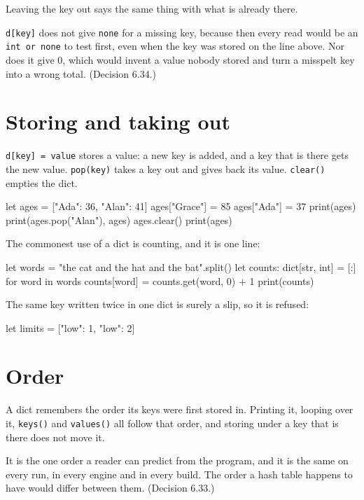 Leaving the key out says the same thing with what is already there.

\begin{why}
\verb|d[key]| does not give \verb|none| for a missing key, because then
every read would be an \verb|int or none| to test first, even when the
key was stored on the line above. Nor does it give 0, which would
invent a value nobody stored and turn a misspelt key into a wrong
total. (Decision 6.34.)
\end{why}

\section{Storing and taking out}

\verb|d[key] = value| stores a value: a new key is added, and a key
that is there gets the new value. \verb|pop(key)| takes a key out and
gives back its value. \verb|clear()| empties the dict.

\begin{zeno}
let ages = ["Ada": 36, "Alan": 41]
ages["Grace"] = 85
ages["Ada"] = 37
print(ages)
print(ages.pop("Alan"), ages)
ages.clear()
print(ages)
\end{zeno}

The commonest use of a dict is counting, and it is one line:

\begin{zeno}
let words = "the cat and the hat and the bat".split()
let counts: dict[str, int] = [:]
for word in words {
    counts[word] = counts.get(word, 0) + 1
}
print(counts)
\end{zeno}

The same key written twice in one dict is surely a slip, so it is
refused:

\begin{zeno}[fails=yes]
let limits = ["low": 1, "low": 2]
\end{zeno}

\section{Order}

A dict remembers the order its keys were first stored in. Printing it,
looping over it, \verb|keys()| and \verb|values()| all follow that
order, and storing under a key that is there does not move it.

\begin{why}
It is the one order a reader can predict from the program, and it is
the same on every run, in every engine and in every build. The order a
hash table happens to have would differ between them. (Decision 6.33.)
\end{why}

